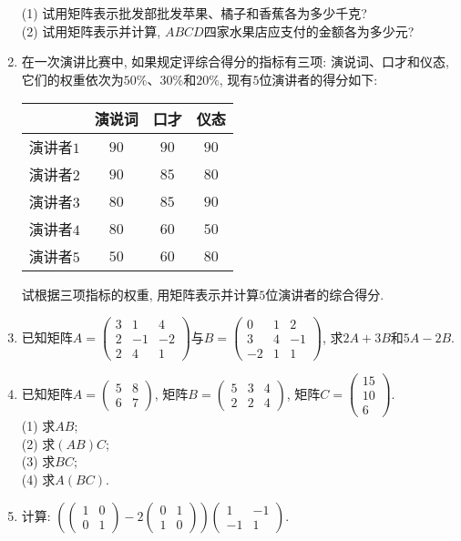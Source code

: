 \documentclass[10pt,a4paper]{article}
\begin{document}
\begin{enumerate}[1.]
(1) 试用矩阵表示批发部批发苹果、橘子和香蕉各为多少千克?\\
(2) 试用矩阵表示并计算, $ABCD$四家水果店应支付的金额各为多少元?
\item 在一次演讲比赛中, 如果规定评综合得分的指标有三项: 演说词、口才和仪态, 它们的权重依次为$50\%$、$30\%$和$20\%$, 现有$5$位演讲者的得分如下:
\begin{center}
    \begin{tabular}{|c|c|c|c|}
        \hline
        & 演说词 & 口才 & 仪态\\ \hline
        演讲者$1$ & $90$ & $90$ & $90$\\ \hline
        演讲者$2$ & $90$ & $85$ & $80$\\ \hline
        演讲者$3$ & $80$ & $85$ & $90$\\ \hline
        演讲者$4$ & $80$ & $60$ & $50$\\ \hline
        演讲者$5$ & $50$ & $60$ & $80$\\ \hline
    \end{tabular}
\end{center}
试根据三项指标的权重, 用矩阵表示并计算$5$位演讲者的综合得分.
\item 已知矩阵$A=\begin{pmatrix}   3 & 1 & 4  \\2 & -1 & -2  \\2 & 4 & 1  \end{pmatrix}$与$B=\begin{pmatrix}
0 & 1 & 2  \\3 & 4 & -1  \\-2 & 1 & 1  \end{pmatrix}$, 求$2A+3B$和$5A-2B$.
\item 已知矩阵$A=\begin{pmatrix}    5 & 8  \\6 & 7  \end{pmatrix}$, 矩阵$B=\begin{pmatrix}   5 & 3 & 4  \\2 & 2 & 4  \end{pmatrix}$, 矩阵$C=\begin{pmatrix}    15  \\10  \\6  \end{pmatrix}$.\\
(1) 求$AB$;\\
(2) 求$(AB)C$;\\
(3) 求$BC$;\\
(4) 求$A(BC)$.
\item 计算: $(\begin{pmatrix}    1 & 0  \\0 & 1  \end{pmatrix}-2\begin{pmatrix}    0 & 1  \\1 & 0  \end{pmatrix})\begin{pmatrix}    1 & -1  \\-1 & 1  \end{pmatrix}$.

\end{enumerate}
\end{document}

